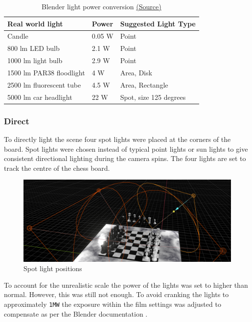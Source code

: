 \documentclass[11pt]{article}
\begin{document}
\begin{table}[htbp]
\caption{Blender light power conversion \href{https://docs.blender.org/manual/en/latest/render/lights/light\_object.html\#power-of-lights}{(Source)}}
\centering
\begin{tabular}{lll}
\hline
\textbf{Real world light} & \textbf{Power} & \textbf{Suggested Light Type}\\
\hline
Candle & 0.05 W & Point\\
\hline
800 lm LED bulb & 2.1 W & Point\\
\hline
1000 lm light bulb & 2.9 W & Point\\
\hline
1500 lm PAR38 floodlight & 4 W & Area, Disk\\
\hline
2500 lm fluorescent tube & 4.5 W & Area, Rectangle\\
\hline
5000 lm car headlight & 22 W & Spot, size 125 degrees\\
\hline
\end{tabular}
\end{table}

\subsubsection{Direct}
\label{sec:org52578a3}
To directly light the scene four spot lights were placed at the corners of the
board. Spot lights were chosen instead of typical point lights or sun
lights to give consistent directional lighting during the camera spins. The four
lights are set to track the centre of the chess board.
\begin{figure}[htbp]
\centering
\includegraphics[width=\textwidth]{Images/lighting.png}
\caption{Spot light positions}
\end{figure}
To account for the unrealistic scale the power of the lights was set to higher
than normal. However, this was still not enough. To avoid cranking the lights
to approximately \texttt{1MW} the exposure within the film settings was adjusted to
compensate as per the Blender documentation \cite{light-power-docs}.
\end{document}
